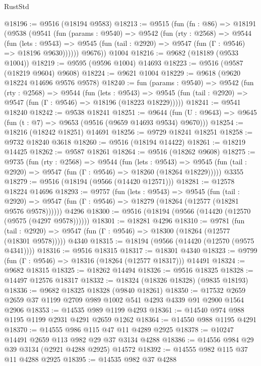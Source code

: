 \begin{lexlean}{RustStd}
\begin{coremodule}
@18196 := @9516 (@18194 @9583)
@18213 := @9515
    (fun (fn : @86) =>
    @18191
      (@9538
        (@9541
          (fun (params : @9540) =>
          @9542
            (fun (rty : @2568) =>
            @9544
              (fun (lets : @9543) =>
              @9545 (fun (tail : @2920) => @9547 (fun (Γ : @9546) => @18196 @9630))))))
        @9676))
    @1004
@18216 := @9682 (@18189 (@9533 @1004))
@18219 := @9595 (@9596 @1004) @14693
@18223 := @9516 (@9587 (@18219 @9604) @9608)
@18224 := @9621 @1004
@18229 := @9618 (@9620 @18224 @14696 @9576 @9578)
@18240 := fun (params : @9540) =>
  @9542
    (fun (rty : @2568) =>
    @9544
      (fun (lets : @9543) =>
      @9545 (fun (tail : @2920) => @9547 (fun (Γ : @9546) => @18196 (@18223 @18229)))))
@18241 := @9541 @18240
@18242 := @9538 @18241
@18251 := @9644
    (fun (U : @9643) => @9645 (fun (t : @7) => @9653 (@9516 (@9659 @14693 @9534) @9670)))
@18254 := @18216 (@18242 @18251) @14691
@18256 := @9729 @18241 @18251
@18258 := @9732 @18240 @3618
@18260 := @9516 (@18194 @14422)
@18261 := @18219 @14425
@18262 := @9587 @18261
@18264 := @9516 (@18262 @9608)
@18275 := @9735
    (fun (rty : @2568) =>
    @9544
      (fun (lets : @9543) =>
      @9545 (fun (tail : @2920) => @9547 (fun (Γ : @9546) => @18260 (@18264 @18229)))))
    @3355
@18279 := @9516 (@18194 (@9566 (@14420 @12571)))
@18281 := @12578 @18224 @14696
@18293 := @9757
    (fun (lets : @9543) =>
    @9545
      (fun (tail : @2920) =>
      @9547 (fun (Γ : @9546) => @18279 (@18264 (@12577 (@18281 @9576 @9578))))))
    @4296
@18300 := @9516 (@18194 (@9566 (@14420 (@12570 (@9575 (@4297 @9578))))))
@18301 := @18281 @4296
@18310 := @9781
    (fun (tail : @2920) => @9547 (fun (Γ : @9546) => @18300 (@18264 (@12577 (@18301 @9578)))))
    @4340
@18315 := @18194 (@9566 (@14420 (@12570 (@9575 @4341))))
@18316 := @9516 @18315
@18317 := @18301 @4340
@18323 := @9799 (fun (Γ : @9546) => @18316 (@18264 (@12577 @18317))) @14491
@18324 := @9682 @18315
@18325 := @18262 @14494
@18326 := @9516 @18325
@18328 := @14497 @12576 @18317
@18332 := @18324 (@18326 @18328) (@9835 @18193)
@18336 := @9682 @18325 @18328 (@9840 @18261)
@18350 := @17532 @2659 @2659 @37 @1199 @2709 @989 @1002 @541 @4293 @4339 @91 @2900 @1564 @2906
@18353 := @14535 @989 @1199 @4293
@18361 := @14540 @974 @988 @1195 @1199 @2931 @4291 @2659 @1262
@18364 := @14550 @988 @1195 @4291
@18370 := @14555 @986 @115 @47 @11 @4289 @2925
@18378 := @10247 @14491 @2659 @113 @982 @29 @37 @3134 @4288
@18386 := @14556 @984 @29 @39 @3134 (@2921 @4288 @2925) @14572
@18392 := @14555 @982 @115 @37 @11 @4288 @2925
@18395 := @14535 @982 @37 @4288

\end{coremodule}
\end{lexlean}
